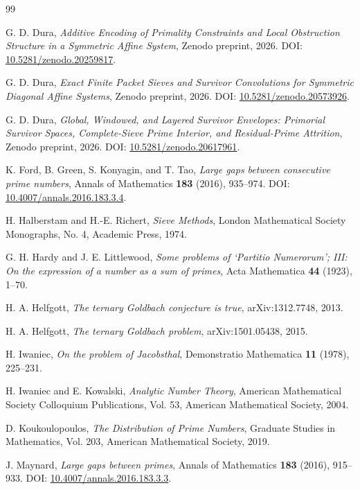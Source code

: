 \documentclass[11pt]{article}
\theoremstyle{plain}
\theoremstyle{definition}
\theoremstyle{remark}
\begin{document}
\begin{thebibliography}{99}

G. D. Dura,
\emph{Additive Encoding of Primality Constraints and Local Obstruction Structure in a Symmetric Affine System},
Zenodo preprint, 2026.
DOI: \href{https://doi.org/10.5281/zenodo.20259817}{10.5281/zenodo.20259817}.

G. D. Dura,
\emph{Exact Finite Packet Sieves and Survivor Convolutions for Symmetric Diagonal Affine Systems},
Zenodo preprint, 2026.
DOI: \href{https://doi.org/10.5281/zenodo.20573926}{10.5281/zenodo.20573926}.


G. D. Dura,
\emph{Global, Windowed, and Layered Survivor Envelopes: Primorial Survivor Spaces, Complete-Sieve Prime Interior, and Residual-Prime Attrition},
Zenodo preprint, 2026.
DOI: \href{https://doi.org/10.5281/zenodo.20617961}{10.5281/zenodo.20617961}.

K. Ford, B. Green, S. Konyagin, and T. Tao,
\emph{Large gaps between consecutive prime numbers},
Annals of Mathematics \textbf{183} (2016), 935--974.
DOI: \href{https://doi.org/10.4007/annals.2016.183.3.4}{10.4007/annals.2016.183.3.4}.

H. Halberstam and H.-E. Richert,
\emph{Sieve Methods},
London Mathematical Society Monographs, No. 4, Academic Press, 1974.

G. H. Hardy and J. E. Littlewood,
\emph{Some problems of `Partitio Numerorum'; III: On the expression of a number as a sum of primes},
Acta Mathematica \textbf{44} (1923), 1--70.

H. A. Helfgott,
\emph{The ternary Goldbach conjecture is true},
arXiv:1312.7748, 2013.

H. A. Helfgott,
\emph{The ternary Goldbach problem},
arXiv:1501.05438, 2015.

H. Iwaniec,
\emph{On the problem of Jacobsthal},
Demonstratio Mathematica \textbf{11} (1978), 225--231.

H. Iwaniec and E. Kowalski,
\emph{Analytic Number Theory},
American Mathematical Society Colloquium Publications, Vol. 53, American Mathematical Society, 2004.

D. Koukoulopoulos,
\emph{The Distribution of Prime Numbers},
Graduate Studies in Mathematics, Vol. 203, American Mathematical Society, 2019.

J. Maynard,
\emph{Large gaps between primes},
Annals of Mathematics \textbf{183} (2016), 915--933.
DOI: \href{https://doi.org/10.4007/annals.2016.183.3.3}{10.4007/annals.2016.183.3.3}.

\end{thebibliography}
\end{document}
